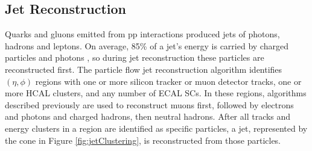 \subsection{Jet Reconstruction}
\label{sec:jetReco}
Quarks and gluons emitted from pp interactions produced jets of photons, hadrons and leptons.  On average, 85\% of a jet's 
energy is carried by charged particles and photons \cite{pflowJetRecoInCollisions}, so during jet reconstruction these particles are 
reconstructed first.  The particle flow jet reconstruction algorithm \cite{pflowEventReco} identifies $(\eta,\phi)$ regions with one or 
more silicon tracker or muon detector tracks, one or more HCAL clusters, and any number of ECAL SCs.  In these regions, algorithms 
described previously are used to reconstruct muons first, followed by electrons and photons and charged hadrons, then neutral hadrons.  
After all tracks and energy clusters in a region are identified as specific particles, a jet, represented by the cone in Figure 
\ref{fig:jetClustering}, is reconstructed from those particles.

